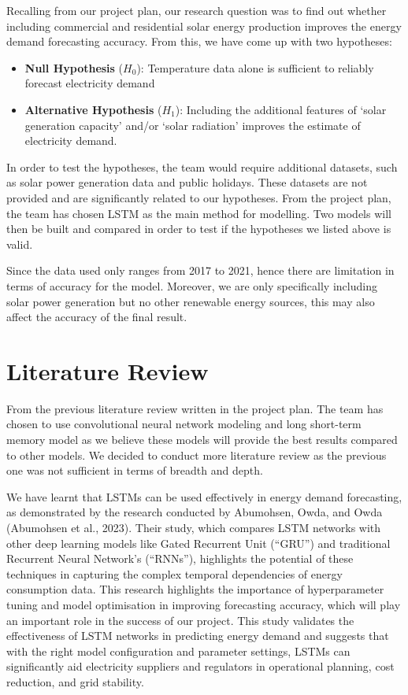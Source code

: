 \documentclass[
]{article}
\begin{document}
Recalling from our project plan, our research question was to find out
whether including commercial and residential solar energy production
improves the energy demand forecasting accuracy. From this, we have come
up with two hypotheses:

\begin{itemize}
\item
  \textbf{Null Hypothesis} (\(H_0\)): Temperature data alone is
  sufficient to reliably forecast electricity demand
\item
  \textbf{Alternative Hypothesis} (\(H_1\)): Including the additional
  features of `solar generation capacity' and/or `solar radiation'
  improves the estimate of electricity demand.
\end{itemize}

In order to test the hypotheses, the team would require additional
datasets, such as solar power generation data and public holidays. These
datasets are not provided and are significantly related to our
hypotheses. From the project plan, the team has chosen LSTM as the main
method for modelling. Two models will then be built and compared in
order to test if the hypotheses we listed above is valid.

Since the data used only ranges from 2017 to 2021, hence there are
limitation in terms of accuracy for the model. Moreover, we are only
specifically including solar power generation but no other renewable
energy sources, this may also affect the accuracy of the final result.

\section{Literature Review}\label{literature-review}

From the previous literature review written in the project plan. The
team has chosen to use convolutional neural network modeling and long
short-term memory model as we believe these models will provide the best
results compared to other models. We decided to conduct more literature
review as the previous one was not sufficient in terms of breadth and
depth.

We have learnt that LSTMs can be used effectively in energy demand
forecasting, as demonstrated by the research conducted by Abumohsen,
Owda, and Owda (Abumohsen et al., 2023). Their study, which compares
LSTM networks with other deep learning models like Gated Recurrent Unit
(``GRU'') and traditional Recurrent Neural Network's (``RNNs''),
highlights the potential of these techniques in capturing the complex
temporal dependencies of energy consumption data. This research
highlights the importance of hyperparameter tuning and model
optimisation in improving forecasting accuracy, which will play an
important role in the success of our project. This study validates the
effectiveness of LSTM networks in predicting energy demand and suggests
that with the right model configuration and parameter settings, LSTMs
can significantly aid electricity suppliers and regulators in
operational planning, cost reduction, and grid stability.
\end{document}
